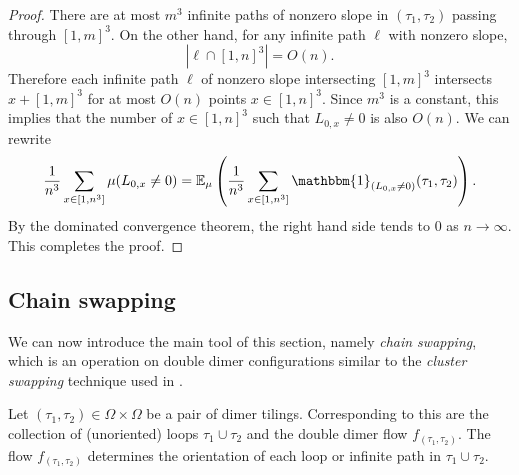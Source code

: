 \documentclass[11pt]{article}
\theoremstyle{remark}
\theoremstyle{definition}
\newcommand{\m}[1]{\mathbb{#1}}
\begin{document}
\begin{proof} 
There are at most $m^3$ infinite paths of nonzero slope in $(\tau_1,\tau_2)$ passing through $[1,m]^3$. On the other hand, for any infinite path $\ell$ with nonzero slope, 
$$|\ell \cap [1,n]^3| = O(n).$$ 
Therefore each infinite path $\ell$ of nonzero slope intersecting $[1,m]^3$ intersects $x + [1,m]^3$ for at most $O(n)$ points $x\in [1,n]^3$. Since $m^3$ is a constant, this implies that the number of $x\in [1,n]^3$ such that $L_{0,x} \neq 0$ is also $O(n)$. We can rewrite 
$$\frac{1}{n^3}\sum_{x\in [1,n^3]}  \mu (L_{0, x}\neq 0)=\m E_{\mu}\left(\frac{1}{n^3}\sum_{x\in [1,n^3]}  \mathbbm{1}_{(L_{0, x}\neq 0)}(\tau_1,\tau_2)\right).$$
By the dominated convergence theorem, the right hand side tends to $0$ as $n\to \infty$. This completes the proof.
\end{proof}

\subsection{Chain swapping}\label{Subsection: Dimer Swapping}

We can now introduce the main tool of this section, namely \textit{chain swapping}, which is an operation on double dimer configurations similar to the \textit{cluster swapping} technique used in \cite[Chapter 8]{AST_2005__304__R1_0}. 

Let $(\tau_1,\tau_2)\in \Omega\times \Omega$ be a pair of dimer tilings. Corresponding to this are the collection of (unoriented) loops $\tau_1\cup \tau_2$ and the double dimer flow $f_{(\tau_1,\tau_2)}$. The flow $f_{(\tau_1,\tau_2)}$ determines the orientation of each loop or infinite path in $\tau_1\cup \tau_2$. 
\end{document}
